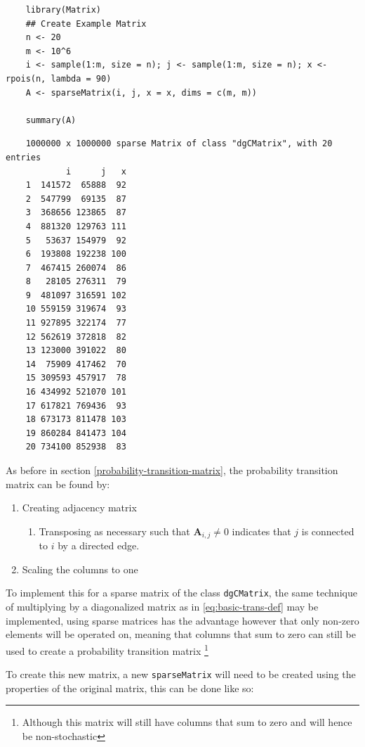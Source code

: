 \documentclass[11pt]{report}
\begin{document}
\begin{tcolorbox}
    \begin{verbatim}
    library(Matrix)
    ## Create Example Matrix
    n <- 20
    m <- 10^6
    i <- sample(1:m, size = n); j <- sample(1:m, size = n); x <- rpois(n, lambda = 90)
    A <- sparseMatrix(i, j, x = x, dims = c(m, m))

    summary(A)
    \end{verbatim}
\tcblower
    \begin{verbatim}
    1000000 x 1000000 sparse Matrix of class "dgCMatrix", with 20 entries
            i      j   x
    1  141572  65888  92
    2  547799  69135  87
    3  368656 123865  87
    4  881320 129763 111
    5   53637 154979  92
    6  193808 192238 100
    7  467415 260074  86
    8   28105 276311  79
    9  481097 316591 102
    10 559159 319674  93
    11 927895 322174  77
    12 562619 372818  82
    13 123000 391022  80
    14  75909 417462  70
    15 309593 457917  78
    16 434992 521070 101
    17 617821 769436  93
    18 673173 811478 103
    19 860284 841473 104
    20 734100 852938  83
    \end{verbatim}
\end{tcolorbox}

As before in section \ref{probability-transition-matrix}, the probability transition matrix can be found by:

\begin{enumerate}
\item Creating adjacency matrix
\begin{enumerate}
\item Transposing as necessary such that \(\mathbf{A}_{i,j}\neq 0\) indicates that \(j\) is connected to \(i\) by a directed edge.
\end{enumerate}
\item Scaling the columns to one
\end{enumerate}

To implement this for a sparse matrix of the class \texttt{dgCMatrix}, the same
technique of multiplying by a diagonalized matrix as in \eqref{eq:basic-trans-def} may be
implemented, using sparse matrices has the advantage however that only non-zero
elements will be operated on, meaning that columns that sum to zero can still
be used to create a probability transition matrix \footnote{Although this matrix will
still have columns that sum to zero and will hence be non-stochastic}

To create this new matrix, a new \texttt{sparseMatrix} will
need to be created using the properties of the original matrix, this can be done
like so:
\end{document}
